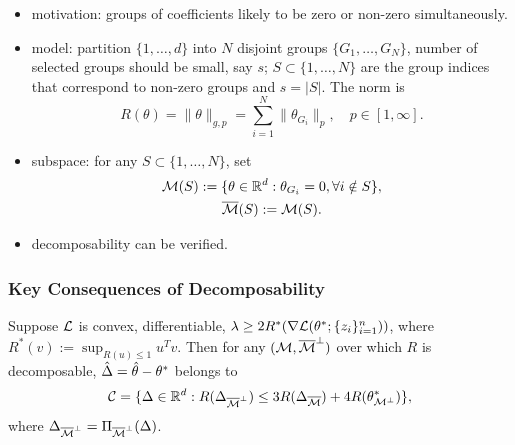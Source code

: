 \begin{ex} \leavevmode
\begin{itemize}
    \item motivation: groups of coefficients likely to be
        zero or non-zero simultaneously.
    \item model: partition $\{1,\dots,d\}$ into $N$ disjoint groups
        $\{G_1,\dots,G_N\}$, number of selected groups should be small,
        say $s$; \ie $S\subset \{1,\dots,N\}$
        are the group indices that correspond to non-zero groups and $s=|S|$.
        The norm is
        \begin{equation}
            R(\theta) = \|\theta\|_{g,p} = \sum_{i=1}^N\|\theta_{G_i}\|_p,\quad p \in[1,\infty].
        \end{equation}
    \item subspace: for any $S\subset\{1,\dots,N\}$, set
        \begin{gather}
            \mathcal{M}(S) := \{\theta\in{\mathbb{R}}^d:\theta_{G_i}=0, \forall i\notin S\}, \\
            {\overline{\mathcal{M}}}(S) := \mathcal{M}(S).
        \end{gather}
    \item decomposability can be verified.
\end{itemize}
\end{ex}

\subsubsection{Key Consequences of Decomposability}

\begin{pro} Suppose $\mathcal{L}$ is convex, differentiable,
    $\lambda\ge 2R^*(\nabla\mathcal{L}(\theta^*;\{z_i\}_{i=1}^n))$,
    where $R^*(v):=\sup_{R(u)\le 1}u^T v$.
    Then for any $(\mathcal{M}, {\overline{\mathcal{M}}}^\perp)$ over which $R$ is decomposable,
    ${\hat\Delta} = {\hat{\theta}} - \theta^*$ belongs to
    \begin{equation}
        \mathcal{C}=\{\Delta\in{\mathbb{R}}^d:R(\Delta_{{\overline{\mathcal{M}}}^\perp})\le 3 R(\Delta_{{\overline{\mathcal{M}}}}) + 4R(\theta^*_{\mathcal{M}^\perp})\},
    \end{equation}
    where $\Delta_{{\overline{\mathcal{M}}}^\perp}=\Pi_{{\overline{\mathcal{M}}}^\perp}(\Delta)$.
\end{pro}

